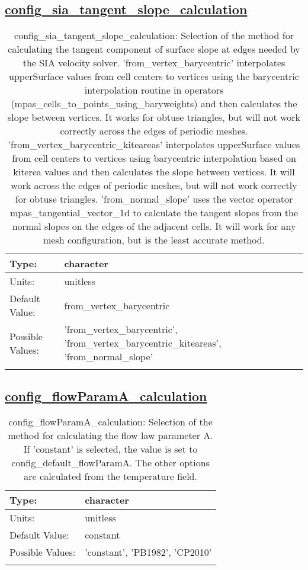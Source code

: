 \subsection[config\_sia\_tangent\_slope\_calculation]{\hyperref[sec:nm_tab_velocity_solver]{config\_sia\_tangent\_slope\_calculation}}
\label{subsec:nm_sec_config_sia_tangent_slope_calculation}
\begin{center}
\begin{longtable}{| p{2.0in} || p{4.0in} |}
    \hline
    Type: & character \\
    \hline
    Units: & \si{unitless} \\
    \hline
    Default Value: & from\_vertex\_barycentric \\
    \hline
    Possible Values: & 'from\_vertex\_barycentric', 'from\_vertex\_barycentric\_kiteareas', 'from\_normal\_slope' \\
    \hline
    \caption{config\_sia\_tangent\_slope\_calculation: Selection of the method for calculating the tangent component of surface slope at edges needed by the SIA velocity solver. 'from\_vertex\_barycentric' interpolates upperSurface values from cell centers to vertices using the barycentric interpolation routine in operators (mpas\_cells\_to\_points\_using\_baryweights) and then calculates the slope between vertices.  It works for obtuse triangles, but will not work correctly across the edges of periodic meshes. 'from\_vertex\_barycentric\_kiteareas' interpolates upperSurface values from cell centers to vertices using barycentric interpolation based on kiterea values and then calculates the slope between vertices.  It will work across the edges of periodic meshes, but will not work correctly for obtuse triangles. 'from\_normal\_slope' uses the vector operator mpas\_tangential\_vector\_1d to calculate the tangent slopes from the normal slopes on the edges of the adjacent cells.  It will work for any mesh configuration, but is the least accurate method.}
\end{longtable}
\end{center}
\subsection[config\_flowParamA\_calculation]{\hyperref[sec:nm_tab_velocity_solver]{config\_flowParamA\_calculation}}
\label{subsec:nm_sec_config_flowParamA_calculation}
\begin{center}
\begin{longtable}{| p{2.0in} || p{4.0in} |}
    \hline
    Type: & character \\
    \hline
    Units: & \si{unitless} \\
    \hline
    Default Value: & constant \\
    \hline
    Possible Values: & 'constant', 'PB1982', 'CP2010' \\
    \hline
    \caption{config\_flowParamA\_calculation: Selection of the method for calculating the flow law parameter A.  If 'constant' is selected, the value is set to config\_default\_flowParamA.  The other options are calculated from the temperature field.}
\end{longtable}
\end{center}
